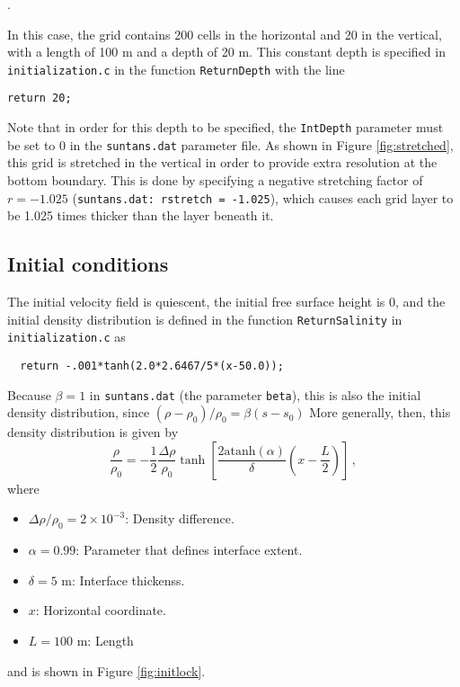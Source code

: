 \documentclass[12pt,oneside]{article}
\begin{document}
\medskip
\noindent
\mfiledownload.

\medskip
\noindent
In this case, the grid contains 200 cells in the horizontal and 20 in the vertical, with
a length of 100 m and a depth of 20 m.  This constant depth is specified in \verb+initialization.c+
in the function \verb+ReturnDepth+ with the line
\begin{verbatim}
return 20;
\end{verbatim}
Note that in order for this depth to be specified, the \verb+IntDepth+ parameter must
be set to 0 in the \verb+suntans.dat+ parameter file.  As shown in Figure \ref{fig:stretched},
this grid is stretched in the
vertical in order to provide extra resolution at the bottom boundary.  This is done by
specifying a negative stretching factor of $r=-1.025$ (\verb+suntans.dat: rstretch = -1.025+),
which causes each grid layer to be 1.025 times thicker than the layer beneath it.  

\subsection{Initial conditions}

The initial velocity field is quiescent, the initial free surface height is 0,
and the initial density distribution is defined in the function \verb+ReturnSalinity+
in \verb+initialization.c+ as
\begin{verbatim}
  return -.001*tanh(2.0*2.6467/5*(x-50.0));
\end{verbatim}
Because $\beta=1$ in \verb+suntans.dat+ (the parameter \verb+beta+), this is also the initial density 
distribution, since $(\rho-\rho_0)/\rho_0 = \beta(s-s_0)$ More generally, then, 
this density distribution is given by
\[
\frac{\rho}{\rho_0} = -\frac{1}{2}\frac{\Delta\rho}{\rho_0}
\tanh\left[\frac{2\mbox{atanh}(\alpha)}{\delta}\left(x-\frac{L}{2}\right)\right]\,,
\]
where
\begin{itemize}
\item $\Delta\rho/\rho_0=2\times 10^{-3}$: Density difference.
\item $\alpha=0.99$: Parameter that defines interface extent.
\item $\delta=5$ m: Interface thickenss.
\item $x$: Horizontal coordinate.
\item $L=100$ m: Length
\end{itemize}
and is shown in Figure \ref{fig:initlock}. 
\end{document}
